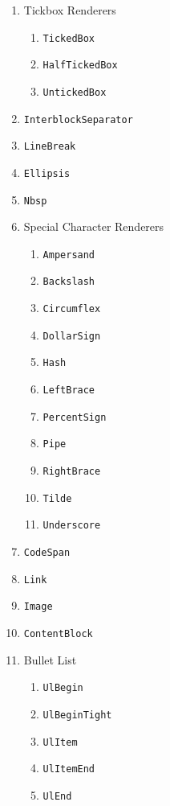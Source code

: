 \documentclass[
  digital,     %
  oneside,     %
  nosansbold,  %
  nocolorbold, %
  lof,         %
  lot,         %
]{fithesis4}
\begin{document}
\begin{figure}
  \centering
  \begin{multicols}{2}
    \begin{enumerate}
      \item Tickbox Renderers
      \begin{enumerate}
        \item \texttt{TickedBox}
        \item \texttt{HalfTickedBox}
        \item \texttt{UntickedBox}
      \end{enumerate}
      \item \texttt{InterblockSeparator}
      \item \texttt{LineBreak}
      \item \texttt{Ellipsis}
      \item \texttt{Nbsp}
      \item Special Character Renderers
      \begin{enumerate}
        \item \texttt{Ampersand}
        \item \texttt{Backslash}
        \item \texttt{Circumflex}
        \item \texttt{DollarSign}
        \item \texttt{Hash}
        \item \texttt{LeftBrace}
        \item \texttt{PercentSign}
        \item \texttt{Pipe}
        \item \texttt{RightBrace}
        \item \texttt{Tilde}
        \item \texttt{Underscore}
      \end{enumerate}
      \item \texttt{CodeSpan}
      \item \texttt{Link}
      \item \texttt{Image}
      \item \texttt{ContentBlock}
      \item Bullet List
      \begin{enumerate}
        \item \texttt{UlBegin}
        \item \texttt{UlBeginTight}
        \item \texttt{UlItem}
        \item \texttt{UlItemEnd}
        \item \texttt{UlEnd}

\end{enumerate}
\end{enumerate}
\end{multicols}
\end{figure}
\end{document}
